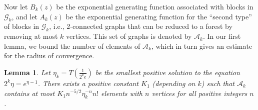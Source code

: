 \documentclass[a4paper]{article}
\newcommand{\G}{\mathcal{G}}
\newcommand{\A}{\mathcal{A}}
\newtheorem{lemma}{Lemma}
\theoremstyle{remark}
\begin{document}
Now let $B_k(z)$ be the exponential generating function associated with blocks in $\G_k$, and let $A_k(z)$ be the exponential generating function for the ``second type'' of blocks in $\G_k$, i.e., 2-connected graphs that can be reduced to a forest by removing at most $k$ vertices. This set of graphs is denoted by $\A_k$.
In our first lemma, we bound the number of elements of $\A_k$, which in turn gives an estimate for the radius of convergence.

\begin{lemma}\label{lem:upper}
Let $\eta_k = T(\frac{1}{2^k e})$ be the smallest positive solution to the equation $2^k \eta = e^{\eta-1}$. There exists a positive constant $K_1$ (depending on $k$) such that $\A_k$ contains at most $K_1 n^{-5/2} \eta_k^{-n}n!$ elements with $n$ vertices for all positive integers $n$.
\end{lemma}
\end{document}
